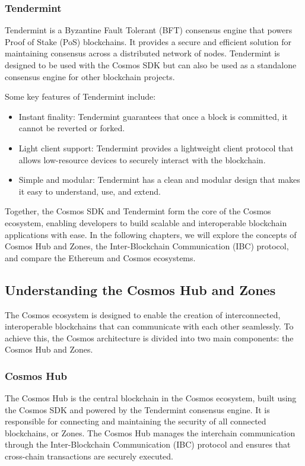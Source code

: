 \documentclass{article}
\begin{document}
\subsubsection{Tendermint}

Tendermint is a Byzantine Fault Tolerant (BFT) consensus engine that powers Proof of Stake (PoS) blockchains. It provides a secure and efficient solution for maintaining consensus across a distributed network of nodes. Tendermint is designed to be used with the Cosmos SDK but can also be used as a standalone consensus engine for other blockchain projects.

Some key features of Tendermint include:

\begin{itemize}
\item Instant finality: Tendermint guarantees that once a block is committed, it cannot be reverted or forked.
\item Light client support: Tendermint provides a lightweight client protocol that allows low-resource devices to securely interact with the blockchain.
\item Simple and modular: Tendermint has a clean and modular design that makes it easy to understand, use, and extend.
\end{itemize}

Together, the Cosmos SDK and Tendermint form the core of the Cosmos ecosystem, enabling developers to build scalable and interoperable blockchain applications with ease. In the following chapters, we will explore the concepts of Cosmos Hub and Zones, the Inter-Blockchain Communication (IBC) protocol, and compare the Ethereum and Cosmos ecosystems.

\subsection{Understanding the Cosmos Hub and Zones}

The Cosmos ecosystem is designed to enable the creation of interconnected, interoperable blockchains that can communicate with each other seamlessly. To achieve this, the Cosmos architecture is divided into two main components: the Cosmos Hub and Zones.

\subsubsection{Cosmos Hub}

The Cosmos Hub is the central blockchain in the Cosmos ecosystem, built using the Cosmos SDK and powered by the Tendermint consensus engine. It is responsible for connecting and maintaining the security of all connected blockchains, or Zones. The Cosmos Hub manages the interchain communication through the Inter-Blockchain Communication (IBC) protocol and ensures that cross-chain transactions are securely executed.
\end{document}
